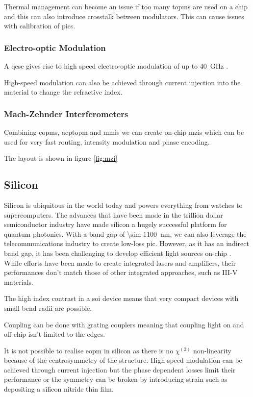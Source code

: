 Thermal management can become an issue if too many \acp{topm} are used on a chip and this can also introduce crosstalk between modulators. This can cause issues with calibration of \acp{pic}.

\subsubsection*{Electro-optic Modulation}

A \ac{qcse} gives rise to high speed electro-optic modulation of up to \SI{40}{GHz} \cite{jeppix}.

High-speed modulation can also be achieved through current injection into the material to change the refractive index. 

\subsubsection*{Mach-Zehnder Interferometers}

Combining \acp{eopm}, acp{topm} and \acp{mmi} we can create on-chip \acp{mzi} which can be used for very fast routing, intensity modulation and phase encoding. 

The layout is shown in figure \ref{fig:mzi}

\subsection{Silicon}

Silicon is ubiquitous in the world today and powers everything from watches to supercomputers. The advances that have been made in the trillion dollar semiconductor industry have made silicon a hugely successful platform for quantum photonics. With a band gap of \SI{\sim 1100}{nm}, we can also leverage the telecommunications industry to create low-loss \acl{pic}. However, as it has an indirect band gap, it has been challenging to develop efficient light sources on-chip \cite{}. While efforts have been made to create integrated lasers and amplifiers, their performances don't match those of other integrated approaches, such as III-V materials.

The high index contrast in a \ac{soi} device means that very compact devices with small bend radii are possible.

Coupling can be done with grating couplers meaning that coupling light on and off chip isn't limited to the edges.

It is not possible to realise \ac{eopm} in silicon as there is no $\chi^{(2)}$ non-linearity because of the centrosymmetry of the structure. High-speed modulation can be achieved through current injection but the phase dependent losses limit their performance \cite{} or the symmetry can be broken by introducing strain such as depositing a silicon nitride thin film.

